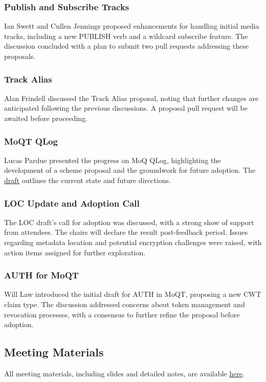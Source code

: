 \documentclass{article}
\begin{document}
\subsubsection{Publish and Subscribe Tracks}
Ian Swett and Cullen Jennings proposed enhancements for handling initial media tracks, including a new PUBLISH verb and a wildcard subscribe feature. The discussion concluded with a plan to submit two pull requests addressing these proposals.

\subsubsection{Track Alias}
Alan Frindell discussed the Track Alias proposal, noting that further changes are anticipated following the previous discussions. A proposal pull request will be awaited before proceeding.

\subsubsection{MoQT QLog}
Lucas Pardue presented the progress on MoQ QLog, highlighting the development of a scheme proposal and the groundwork for future adoption. The \href{https://datatracker.ietf.org/doc/draft-pardue-moq-qlog-moq-events}{draft} outlines the current state and future directions.

\subsubsection{LOC Update and Adoption Call}
The LOC draft's call for adoption was discussed, with a strong show of support from attendees. The chairs will declare the result post-feedback period. Issues regarding metadata location and potential encryption challenges were raised, with action items assigned for further exploration.

\subsubsection{AUTH for MoQT}
Will Law introduced the initial draft for AUTH in MoQT, proposing a new CWT claim type. The discussion addressed concerns about token management and revocation processes, with a consensus to further refine the proposal before adoption.

\subsection{Meeting Materials}
All meeting materials, including slides and detailed notes, are available \href{https://datatracker.ietf.org/meeting/122/materials/}{here}.
\end{document}
